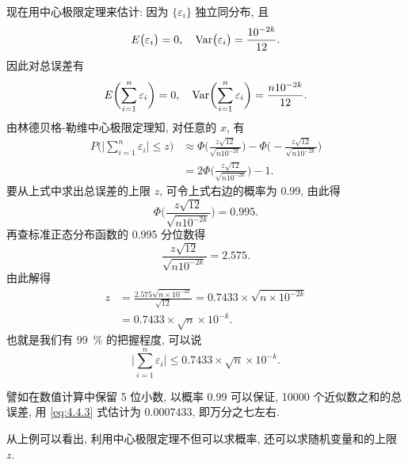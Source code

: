 \begin{example}[数值计算中的误差分析]
    现在用中心极限定理来估计: 因为 $ \{ \varepsilon_i \} $ 独立同分布, 且
    \begin{equation*}
        E \big( \varepsilon_i \bigr) = 0, \quad\operatorname{Var}  \bigl( \varepsilon_i \bigr)= \frac{10^{-2k}}{12}.
    \end{equation*}
    因此对总误差有
    \begin{equation*}
        E \biggl( \sum_{i=1}^n \varepsilon_i \biggr) = 0, \quad\operatorname{Var}  \biggl( \sum_{i=1}^n \varepsilon_i \biggr) = \frac{n 10^{-2k}}{12}.
    \end{equation*}
    由林德贝格-勒维中心极限定理知, 对任意的 $x$, 有
    \begin{align*}
        P \Biggl( \biggl\lvert \sum_{i=1}^n \varepsilon_i \biggr\rvert \leq z \Biggr) & \approx \Phi \biggl( \frac{z \sqrt{12}}{\sqrt{n 10^{-2k}}} \biggr) - \Phi \biggl( -\frac{z \sqrt{12}}{\sqrt{n 10^{-2k}}} \biggr)\\
        & = 2 \Phi \biggl( \frac{z \sqrt{12}}{\sqrt{n 10^{-2k}}} \biggr) - 1.
    \end{align*}
    要从上式中求出总误差的上限 $z$, 可令上式右边的概率为 0.99, 由此得
    \begin{equation*}
        \Phi \biggl( \frac{z \sqrt{12}}{\sqrt{n 10^{-2k}}} \biggr) = 0.995.
    \end{equation*}
    再查标准正态分布函数的 0.995 分位数得
    \begin{equation*}
        \frac{z \sqrt{12}}{\sqrt{n 10^{-2k}}} = 2.575.
    \end{equation*}
    由此解得
    \begin{align*}
        z & = \frac{2.575 \sqrt{n \times 10^{-2k}}}{\sqrt{12}} = 0.7433 \times \sqrt{n \times 10^{-2k}}\\
        & = 0.7433 \times \sqrt{n} \times 10^{-k}.
    \end{align*}
    也就是我们有 \SI{99}{\percent} 的把握程度, 可以说
    \begin{equation}\label{eq:4.4.3}
        \biggl\lvert \sum_{i=1}^n \varepsilon_i \biggr\rvert \leq 0.7433 \times \sqrt{n} \times 10^{-k}.
    \end{equation}

    譬如在数值计算中保留 5 位小数, 以概率 \num{0.99} 可以保证, \num{10000} 个近似数之和的总误差, 用 \eqref{eq:4.4.3} 式估计为 \num{0.0007433}, 即万分之七左右.
\end{example}

从上例可以看出, 利用中心极限定理不但可以求概率, 还可以求随机变量和的上限 $z$.

